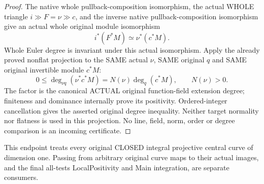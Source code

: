 \begin{proof}
The native whole pullback-composition isomorphism, the actual WHOLE
triangle $i\gg F=\nu\gg c$, and the inverse native pullback-composition
isomorphism give an actual whole original module isomorphism
\[
 i^*(F^*M)\simeq\nu^*(c^*M).
\]
Whole Euler degree is invariant under this actual isomorphism.  Apply
the already proved nonflat projection to the SAME actual $\nu$, SAME
original $q$ and SAME original invertible module $c^*M$:
\[
 0\le \deg_{\nu q}(\nu^*c^*M)
   =N(\nu)\deg_q(c^*M),\qquad N(\nu)>0.
\]
The factor is the canonical ACTUAL original function-field extension
degree; finiteness and dominance internally prove its positivity.
Ordered-integer cancellation gives the asserted original degree
inequality.  Neither target normality nor flatness is used in this
projection.  No line, field, norm, order or degree comparison is an
incoming certificate.
\end{proof}

This endpoint treats every original CLOSED integral projective central
curve of dimension one.  Passing from arbitrary original curve maps to
their actual images, and the final all-tests LocalPositivity and Main
integration, are separate consumers.
